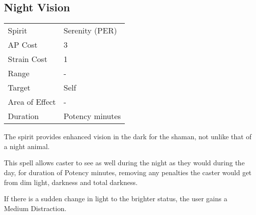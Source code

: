 \documentclass[11pt,a4paper,twocolumn]{book}
\begin{document}

\subsection*{Night Vision}
{
	\begin{tabu} to 70mm{| X[l,4] | X[l,7] |}
		\hline
		Spirit         & Serenity (PER)  \\
		AP Cost        & 3               \\
		Strain Cost    & 1               \\
		Range          & -               \\
		Target         & Self            \\
		Area of Effect & -               \\
		Duration       & Potency minutes \\ \hline
	\end{tabu}
	
}

\medskip

The spirit provides enhanced vision in the dark for the shaman, not unlike that of a night animal.

This spell allows caster to see as well during the night as they would during the day, for duration of Potency minutes, removing any penalties the caster would get from dim light, darkness and total darkness. 

If there is a sudden change in light to the brighter status, the user gains a Medium Distraction.
\end{document}
